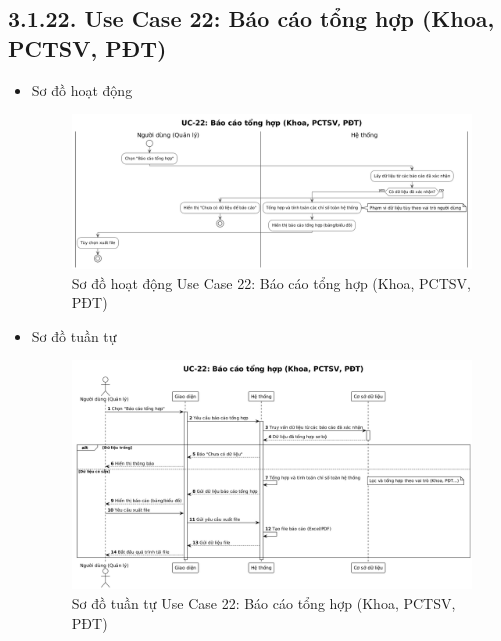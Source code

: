 \subsection*{3.1.22. Use Case 22: Báo cáo tổng hợp (Khoa, PCTSV, PĐT)}
\begin{itemize}
    \item Sơ đồ hoạt động
    \begin{figure}[H]
    \centering
    \includegraphics[scale=0.35 ]{Picture/ACUC22.png}
    \caption{Sơ đồ hoạt động Use Case 22: Báo cáo tổng hợp (Khoa, PCTSV, PĐT)}
    \end{figure}
    \item Sơ đồ tuần tự
    \begin{figure}[H]
    \centering
    \includegraphics[scale=0.35 ]{Picture/SEUC22.png}
    \caption{Sơ đồ tuần tự Use Case 22: Báo cáo tổng hợp (Khoa, PCTSV, PĐT)}
    \end{figure}
\end{itemize}
